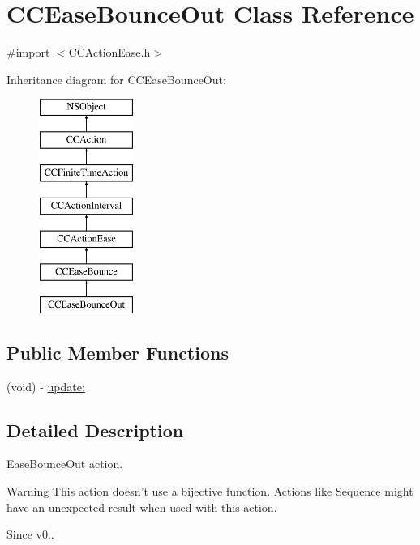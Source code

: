 \hypertarget{interface_c_c_ease_bounce_out}{\section{C\-C\-Ease\-Bounce\-Out Class Reference}
\label{interface_c_c_ease_bounce_out}
}


{\ttfamily \#import $<$C\-C\-Action\-Ease.\-h$>$}

Inheritance diagram for C\-C\-Ease\-Bounce\-Out\-:\begin{figure}[H]
\begin{center}
\leavevmode
\includegraphics[height=7.000000cm]{interface_c_c_ease_bounce_out}
\end{center}
\end{figure}
\subsection*{Public Member Functions}
\begin{DoxyCompactItemize}
\item 
(void) -\/ \hyperlink{interface_c_c_ease_bounce_out_abdf721ee69ca6fe70171005d911ea0bb}{update\-:}
\end{DoxyCompactItemize}


\subsection{Detailed Description}
Ease\-Bounce\-Out action. \begin{DoxyWarning}{Warning}
This action doesn't use a bijective function. Actions like Sequence might have an unexpected result when used with this action. 
\end{DoxyWarning}
\begin{DoxySince}{Since}
v0.. 
\end{DoxySince}


